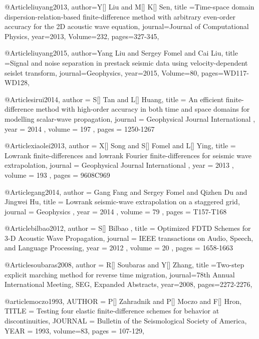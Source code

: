 {@Article{liuyang2013,
  author={Y[] Liu and M[] K[] Sen},
  title ={Time-space domain dispersion-relation-based finite-difference method with arbitrary even-order accuracy for the 2D acoustic wave equation},
  journal={Journal of Computational Physics},
  year=2013,
  Volume=232,
  pages={327-345},
}

@Article{liuyang2015,
  author={Yang Liu and Sergey Fomel and Cai Liu},
  title ={Signal and noise separation in prestack seismic data using velocity-dependent seislet transform},
  journal={Geophysics},
  year=2015,
  Volume=80,
  pages={WD117-WD128},
}
	





@Article{sirui2014,
 author =  { S[] Tan and L[] Huang},
 title =   {An efficient finite-difference method with high-order accuracy in both time and space domains for modelling scalar-wave propagation},
 journal = { Geophysical Journal International },
 year =    { 2014 },
 volume =  { 197 },
 pages =   { 1250-1267 }
}

@Article{xiaolei2013,
 author =  { X[] Song and S[] Fomel and L[] Ying},
 title =   {Lowrank finite-differences and lowrank Fourier finite-differences for seismic wave extrapolation},
 journal = { Geophysical Journal International },
 year =    { 2013 },
 volume =  { 193 },
 pages =   { 960\A8C969 }
}

@Article{gang2014,
 author =  { Gang Fang and Sergey Fomel and Qizhen Du and Jingwei Hu},
 title =   {Lowrank seismic-wave extrapolation on a staggered grid},
 journal = { Geophysics },
 year =    { 2014 },
 volume =  { 79 },
 pages =   { T157-T168}
}


@Article{bilbao2012,
 author =  { S[] Bilbao },
 title =   {Optimized FDTD Schemes for 3-D Acoustic Wave Propagation},
 journal = { IEEE transactions on Audio, Speech, and Language Processing},
 year =    { 2012 },
 volume =  { 20 },
 pages =   { 1658-1663}
}

@Article{soubaras2008,
  author = {R[] Soubaras and Y[] Zhang},
  title ={Two-step explicit marching method for reverse time migration},
  journal={78th Annual International Meeting, SEG, Expanded Abstracts},
  year=2008,
  pages={2272-2276},
}

@article{moczo1993,
  AUTHOR =       {P[] Zahradnik and P[] Moczo and F[] Hron},
  TITLE =        {Testing four elastic finite-difference schemes for behavior at discontinuities},
  JOURNAL =      {Bulletin of the Seismological Society of America},
  YEAR =         {1993},
  volume=83,
  pages = {107-129},
}

}
